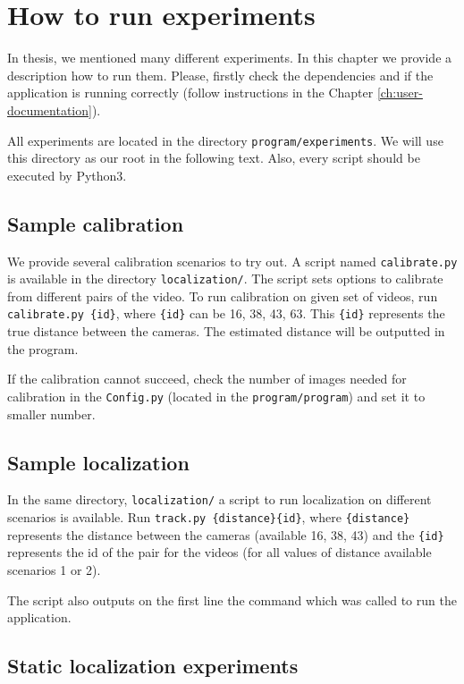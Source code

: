 \chapter{How to run experiments}

In thesis, we mentioned many different experiments. In this chapter we provide
a description how to run them. Please, firstly check the dependencies and if
the application is running correctly (follow instructions in the Chapter \ref{ch:user-documentation}).

All experiments are located in the directory \texttt{program/experiments}. We
will use this directory as our root in the following text. Also, every script
should be executed by Python3.

\section{Sample calibration}

We provide several calibration scenarios to try out. A script named
\verb+calibrate.py+ is available in  the directory \verb+localization/+. The
script sets options to calibrate from different pairs of the video. To run
calibration on given set of videos, run \verb+calibrate.py {id}+, where
\verb+{id}+ can be 16, 38, 43, 63. This \verb+{id}+ represents the true
distance between the cameras. The estimated distance will be outputted in the
program.

If the calibration cannot succeed, check the number of images needed for
calibration in the \verb+Config.py+ (located in the \verb+program/program+)
and set it to smaller number.

\section{Sample localization}

In the same directory, \verb+localization/+ a script to run
localization on different scenarios is available. Run \verb+track.py {distance}{id}+, 
where \verb+{distance}+ represents the distance between the cameras
(available 16, 38, 43) and the \verb+{id}+ represents the id of the pair for the
videos (for all values of distance available scenarios 1 or 2).

The script also outputs on the first line the command which was called to run
the application.

\section{Static localization experiments}

